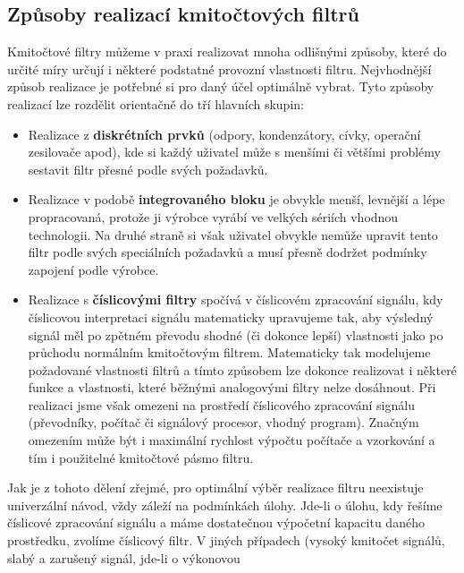    \subsection{Způsoby realizací kmitočtových filtrů}
      Kmitočtové filtry můžeme v praxi realizovat mnoha odlišnými způsoby, které do určité míry
      určují i některé podstatné provozní vlastnosti filtru. Nejvhodnější způsob realizace je
      potřebné si pro daný účel optimálně vybrat. Tyto způsoby realizací lze rozdělit orientačně
        do tří hlavních skupin:
      \begin{itemize}
        \item Realizace z \textbf{diskrétních prvků} (odpory, kondenzátory, cívky, operační
              zesilovače apod), kde si každý uživatel může s menšími či většími problémy sestavit
              filtr přesné podle svých požadavků.
        \item Realizace v podobě \textbf{integrovaného bloku} je obvykle menší, levnější a lépe
              propracovaná, protože ji výrobce vyrábí ve velkých sériích vhodnou technologii. Na
              druhé straně si však uživatel obvykle nemůže upravit tento filtr podle svých
              speciálních požadavků a musí přesně dodržet podmínky zapojení podle výrobce.
        \item Realizace s \textbf{číslicovými filtry} spočívá v číslicovém zpracování signálu, kdy
              číslicovou interpretaci signálu matematicky upravujeme tak, aby výsledný signál měl
              po zpětném převodu shodné (či dokonce lepší) vlastnosti jako po průchodu normálním
              kmitočtovým filtrem. Matematicky tak modelujeme požadované vlastnosti filtrů a tímto
              způsobem lze dokonce realizovat i některé funkce a vlastnosti, které běžnými
              analogovými filtry nelze dosáhnout. Při realizaci jsme však omezeni na prostředí
              číslicového zpracování signálu (převodníky, počítač či signálový procesor, vhodný
              program). Značným omezením může být i maximální rychlost výpočtu počítače a
              vzorkování a tím i použitelné kmitočtové pásmo filtru.         
      \end{itemize}
      Jak je z tohoto dělení zřejmé, pro optimální výběr realizace filtru neexistuje univerzální
      návod, vždy záleží na podmínkách úlohy. Jde-li o úlohu, kdy řešíme číslicové zpracování
      signálu a máme dostatečnou výpočetní kapacitu daného prostředku, zvolíme číslicový filtr. V
      jiných případech (vysoký kmitočet signálů, slabý a zarušený signál, jde-li o výkonovou
